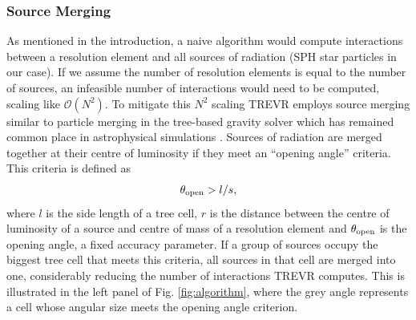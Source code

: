 \documentclass[fleq,usenatbib]{mnras}
\newcommand{\acro}{TREVR}
\newcommand{\bigO}[1]{\mathcal{O}\left(#1\right)}
\begin{document}
\subsubsection{Source Merging}
As mentioned in the introduction, a naive algorithm would compute interactions 
between a resolution element and  all sources of radiation (SPH star particles 
in our case). If we assume the number of resolution elements is equal to the 
number of sources, an infeasible number of interactions would need to be 
computed, scaling like $\bigO{N^2}$. To mitigate this $N^2$ scaling \acro{} 
employs source merging similar to particle merging in the \cite{barnesHut86} 
tree-based gravity solver which has remained common place in astrophysical 
simulations \citep{benz88,vineSigurdsson98,springelEt01,wadsleyEt03,
hubberEt11}. Sources of radiation are merged together at their centre of 
luminosity if they meet an ``opening angle'' criteria. This criteria is 
defined as 
\begin{equation}
\label{eq:openangle}
\theta_{\rm open} > l/s,
\end{equation}
where $l$ is the side length of a tree cell, $r$ is the distance between the 
centre of luminosity of a source and centre of mass of a resolution element 
and $\theta_{\rm open}$ is the opening angle, a fixed accuracy parameter. If a 
group of sources occupy the biggest tree cell that meets this criteria, all 
sources in that cell are merged into one, considerably reducing the number of 
interactions \acro{} computes. This is illustrated in the left panel of Fig. 
\ref{fig:algorithm}, where the grey angle represents a cell whose angular size 
meets the opening angle criterion.
\end{document}
